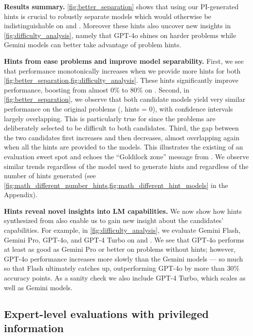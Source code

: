 \textbf{Results summary.}
\cref{fig:better_separation} shows that using our PI-generated hints is crucial to robustly separate models which would otherwise be indistinguishable on \MATHAdv and \GPQA.
Moreover these hints also uncover new insights in \cref{fig:difficulty_analysis}, namely that GPT-4o shines on harder problems while Gemini models can better take advantage of problem hints.



\textbf{Hints from \PI ease problems and improve model separability.}
First, we see that performance monotonically increases when we provide more hints for both \cref{fig:better_separation,fig:difficulty_analysis}.
These hints significantly improve performance, \eg boosting from almost 0\% to 80\% on \MATHAdv.
Second, in \cref{fig:better_separation}, we observe that both candidate models yield very similar performance on the original problems (\ie, hints = $0$), with confidence intervals largely overlapping.
This is particularly true for \MATHAdv since the problems are deliberately selected to be difficult to both candidates.
Third, the gap between the two candidates first increases and then decreases, almost overlapping again when all the hints are provided to the models.
This illustrates the existing of an evaluation sweet spot and echoes the ``Goldilock zone'' message from \cite{Padlewski2024-ag}.
We observe similar trends regardless of the model used to generate hints and regardless of the number of hints generated (see \cref{fig:math_different_number_hints,fig:math_different_hint_models} in the Appendix).



\textbf{Hints reveal novel insights into LM capabilities.}
We now show how hints synthesized from \PI also enable us to gain new insight about the candidates' capabilities.
For example, in \cref{fig:difficulty_analysis}, we evaluate Gemini Flash, Gemini Pro, GPT-4o, and GPT-4 Turbo on \MATHAdv and \GPQA.
We see that GPT-4o performs at least as good as Gemini Pro or better on problems without hints; however, GPT-4o performance increases more slowly than the Gemini models --- so much so that Flash ultimately catches up, outperforming GPT-4o by more than $30\%$ accuracy points.
As a sanity check we also include GPT-4 Turbo, which scales as well as Gemini models.

\subsection{Expert-level evaluations with privileged information}

